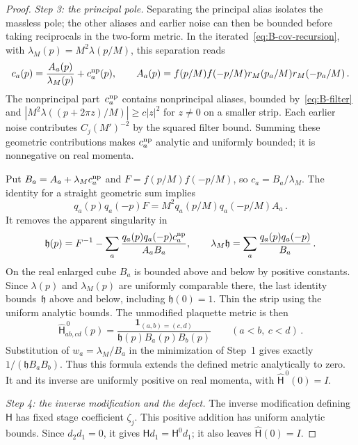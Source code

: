 \begin{proof}
\emph{Step 3: the principal pole.} Separating the principal alias isolates the massless pole; the other aliases and earlier noise can then be bounded before taking reciprocals in the two-form metric. In the iterated~\eqref{eq:B-cov-recursion}, with $\lambda_M(p)=M^2\lambda(p/M)$, this separation reads
\begin{equation*}
c_a(p)=\frac{A_a(p)}{\lambda_M(p)}+c^{\rm np}_a(p),\qquad
A_a(p)=f(p/M)f(-p/M)r_M(p_a/M)r_M(-p_a/M)\,.
\end{equation*}
The nonprincipal part~$c^{\rm np}_a$ contains nonprincipal aliases, bounded by~\eqref{eq:B-filter} and $|M^2\lambda((p+2\pi z)/M)|\ge c|z|^2$ for $z\ne0$ on a smaller strip. Each earlier noise contributes $C_j(M')^{-2}$ by the squared filter bound. Summing these geometric contributions makes $c^{\rm np}_a$ analytic and uniformly bounded; it is nonnegative on real momenta.

Put $B_a=A_a+\lambda_M c^{\rm np}_a$ and $F=f(p/M)f(-p/M)$, so $c_a=B_a/\lambda_M$. The identity for a straight geometric sum implies
\begin{equation*}
q_a(p)q_a(-p)F=M^2q_a(p/M)q_a(-p/M)A_a\,.
\end{equation*}
It removes the apparent singularity in
\begin{equation*}
\mathfrak h(p)=F^{-1}-\sum_a\frac{q_a(p)q_a(-p)c^{\rm np}_a}{A_aB_a},\qquad
\lambda_M\mathfrak h=\sum_a\frac{q_a(p)q_a(-p)}{B_a}\,.
\end{equation*}
On the real enlarged cube $B_a$ is bounded above and below by positive constants. Since $\lambda(p)$ and $\lambda_M(p)$ are uniformly comparable there, the last identity bounds~$\mathfrak h$ above and below, including $\mathfrak h(0)=1$. Thin the strip using the uniform analytic bounds. The unmodified plaquette metric is then
\begin{equation*}
\widehat{\mathsf H}^{\,0}_{ab,cd}(p)=\frac{\mathbf1_{(a,b)=(c,d)}}{\mathfrak h(p)B_a(p)B_b(p)}\qquad(a<b,\ c<d)\,.
\end{equation*}
Substitution of $w_a=\lambda_M/B_a$ in the minimization of Step~1 gives exactly $1/(\mathfrak h B_aB_b)$. Thus this formula extends the defined metric analytically to zero. It and its inverse are uniformly positive on real momenta, with $\widehat{\mathsf H}^{\,0}(0)=I$.

\emph{Step 4: the inverse modification and the defect.} The inverse modification defining $\mathsf H$ has fixed stage coefficient $\zeta_j$. This positive addition has uniform analytic bounds. Since $d_2d_1=0$, it gives $\mathsf H d_1=\mathsf H^0d_1$; it also leaves $\widehat{\mathsf H}(0)=I$.


\end{proof}
